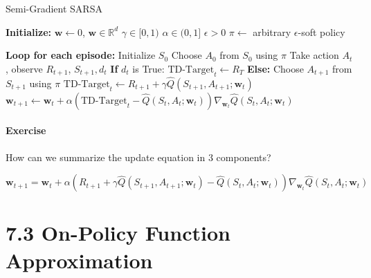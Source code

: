\documentclass[
  letterpaper,
  DIV=11,
  numbers=noendperiod]{scrreprt}
\begin{document}
\begin{algorithm}[htb!]
\caption{Semi-Gradient SARSA}
\begin{algorithmic}[1]
\State \textbf{Initialize:}
\State $\mathbf{w} \gets 0$, $\mathbf{w} \in \mathbb{R}^{d}$
\State $\gamma \in [0,1)$
\State $\alpha \in (0,1]$ 
\State $\epsilon > 0$ 
\State $\pi \gets$ arbitrary $\epsilon$-soft policy 

\State \textbf{Loop for each episode:}
\State Initialize $S_{0}$
\State Choose $A_{0}$ from $S_{0}$ using $\pi$ 
\Repeat
  \State Take action $A_{t}$, observe $R_{t+1}$, $S_{t+1}, d_{t}$
  \State \textbf{If} $d_{t}$ is True:
  \State \quad $\text{TD-Target}_{t} \gets R_{T}$
  \State \textbf{Else:}
  \State \quad Choose $A_{t+1}$ from $S_{t+1}$ using $\pi$
  \State \quad $\text{TD-Target}_{t} \gets R_{t+1} + \gamma \hat{Q}(S_{t+1}, A_{t+1}; \mathbf{w}_{t})$
  \State $\mathbf{w}_{t+1} \gets \mathbf{w}_{t} + \alpha(\text{TD-Target}_{t} - \hat{Q}(S_{t},A_{t}; \mathbf{w}_{t}))\nabla_{\mathbf{w}_{t}} \hat{Q}(S_{t},A_{t}; \mathbf{w}_{t})$

\end{algorithmic}
\end{algorithm}

\subsubsection{Exercise}\label{exercise-12}

How can we summarize the update equation in 3 components?

\[
\mathbf{w}_{t+1} = \mathbf{w}_{t} + \alpha(R_{t+1} + \gamma \hat{Q}(S_{t+1},A_{t+1}; \mathbf{w}_{t}) - \hat{Q}(S_{t},A_{t}; \mathbf{w}_{t}))\nabla_{\mathbf{w}_{t}} \hat{Q}(S_{t},A_{t}; \mathbf{w}_{t})
\]

\begin{tcolorbox}[enhanced jigsaw, opacityback=0, left=2mm, breakable, bottomtitle=1mm, rightrule=.15mm, colframe=quarto-callout-tip-color-frame, titlerule=0mm, colback=white, opacitybacktitle=0.6, toptitle=1mm, title=\textcolor{quarto-callout-tip-color}{\faLightbulb}\hspace{0.5em}{Solution}, colbacktitle=quarto-callout-tip-color!10!white, bottomrule=.15mm, arc=.35mm, coltitle=black, leftrule=.75mm, toprule=.15mm]

\end{tcolorbox}

\chapter{7.3 On-Policy Function
Approximation}\label{on-policy-function-approximation-2}
\end{document}
